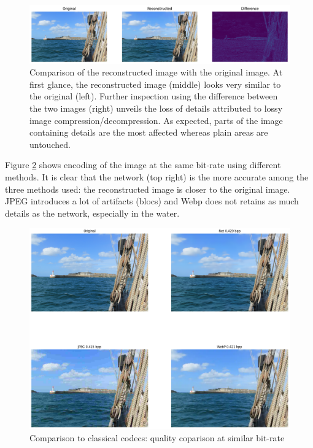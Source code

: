 \begin{figure}
    \centering
    \includegraphics[width=15cm]{img/balle_repro_1.png}
    \caption{Comparison of the reconstructed image with the original image. At first glance, the reconstructed image (middle) looks very similar to the original (left). Further inspection using the difference between the two images (right) unveils the loss of details attributed to lossy image compression/decompression. As expected, parts of the image containing details are the most affected whereas plain areas are untouched.}
    \label{balle_repro_1}
\end{figure}

Figure \ref{balle_repro_2} shows encoding of the image at the same bit-rate using different methods. It is clear that the network (top right) is the more accurate among the three methods used: the reconstructed image is closer to the original image. JPEG introduces a lot of artifacts (blocs) and Webp does not retains as much details as the network, especially in the water.

\begin{figure}
    \centering
    \includegraphics[width=15cm]{img/balle_repro_2.png}
    \caption{Comparison to classical codecs: quality coparison at similar bit-rate}
    \label{balle_repro_2}
\end{figure}

